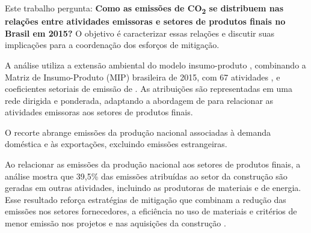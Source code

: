 Este trabalho pergunta: \textbf{Como as emissões de CO\textsubscript{2} se distribuem nas relações entre atividades emissoras e setores de produtos finais no Brasil em 2015?} O objetivo é caracterizar essas relações e discutir suas implicações para a coordenação dos esforços de mitigação.

A análise utiliza a extensão ambiental do modelo insumo-produto \parencite{millerBlair2009}, combinando a Matriz de Insumo-Produto (MIP) brasileira de 2015, com 67 atividades \parencite{ibge2015mip}, e coeficientes setoriais de emissão de \textcite{sanguinetAzzoni2024}. As atribuições são representadas em uma rede dirigida e ponderada, adaptando a abordagem de \textcite{huang2019} para relacionar as atividades emissoras aos setores de produtos finais.

O recorte abrange emissões da produção nacional associadas à demanda doméstica e às exportações, excluindo emissões estrangeiras.

Ao relacionar as emissões da produção nacional aos setores de produtos finais, a análise mostra que 39,5\% das emissões atribuídas ao setor da construção são geradas em outras atividades, incluindo as produtoras de materiais e de energia. Esse resultado reforça estratégias de mitigação que combinam a redução das emissões nos setores fornecedores, a eficiência no uso de materiais e critérios de menor emissão nos projetos e nas aquisições da construção \parencite{rissman2020}.
